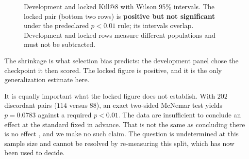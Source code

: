\documentclass[10pt,conference,letterpaper]{IEEEtran}
\makeatletter
\newcommand{\killk}[1]{Kill@#1}
\makeatother
\begin{document}
\begin{figure}[t]
\centering
\caption{Development and locked \killk{8} with Wilson 95\% intervals. The locked
pair (bottom two rows) is \textbf{positive but not significant} under the
predeclared $p < 0.01$ rule; its intervals overlap. Development and locked rows
measure different populations and must not be subtracted.}
\label{fig:devvslocked}
\end{figure}

The shrinkage is what selection bias predicts: the development panel chose the
checkpoint it then scored. The locked figure is positive, and it is the only
generalization estimate here.

It is equally important what the locked figure does not establish. With $202$
discordant pairs ($114$ versus $88$), an exact two-sided McNemar test
\cite{mcnemar1947note,dietterich1998tests} yields $p = 0.0783$ against a
required $p < 0.01$. The data are insufficient to conclude an effect at the
standard fixed in advance. That is not the same as concluding there is no effect
\cite{wasserstein2016asa,amrhein2019retire}, and we make no such claim. The
question is undetermined at this sample size and cannot be resolved by
re-measuring this split, which has now been used to decide.
\end{document}
